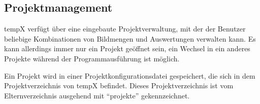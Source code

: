\subsection{Projektmanagement}

\label{subsec:projektmanagement}
	
	\gls{tempX} verfügt über eine eingebaute Projektverwaltung, mit der der Benutzer beliebige Kombinationen von Bildmengen und Auswertungen verwalten kann. Es kann allerdings immer nur ein Projekt geöffnet sein, ein Wechsel in ein anderes Projekte während der Programmausführung ist möglich.\par Ein Projekt wird in einer Projektkonfigurationsdatei gespeichert, die sich in dem Projektverzeichnis von \gls{tempX} befindet. Dieses Projektverzeichnis ist vom Elternverzeichnis ausgehend mit "`projekte"' gekennzeichnet.
	
